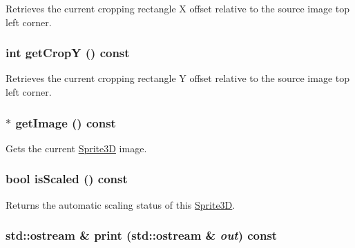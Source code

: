 Retrieves the current cropping rectangle X offset relative to the source image top left corner. \hypertarget{classm3g_1_1Sprite3D_9ef03b219415a1f08aef6745ad5d87d0}{
\subsubsection[{getCropY}]{\setlength{\rightskip}{0pt plus 5cm}int getCropY () const}}
\label{classm3g_1_1Sprite3D_9ef03b219415a1f08aef6745ad5d87d0}


Retrieves the current cropping rectangle Y offset relative to the source image top left corner. \hypertarget{classm3g_1_1Sprite3D_a8c0193b0e7d47d4b5c9f60df24c44f5}{
\subsubsection[{getImage}]{ $\ast$ getImage () const}}
\label{classm3g_1_1Sprite3D_a8c0193b0e7d47d4b5c9f60df24c44f5}


Gets the current \hyperlink{classm3g_1_1Sprite3D}{Sprite3D} image. \hypertarget{classm3g_1_1Sprite3D_8e3e7fa70e1d3f2342580991105779f5}{
\subsubsection[{isScaled}]{\setlength{\rightskip}{0pt plus 5cm}bool isScaled () const}}
\label{classm3g_1_1Sprite3D_8e3e7fa70e1d3f2342580991105779f5}


Returns the automatic scaling status of this \hyperlink{classm3g_1_1Sprite3D}{Sprite3D}. \hypertarget{classm3g_1_1Sprite3D_6fea17fa1532df3794f8cb39cb4f911f}{
\subsubsection[{print}]{\setlength{\rightskip}{0pt plus 5cm}std::ostream \& print (std::ostream \& {\em out}) const}}
\label{classm3g_1_1Sprite3D_6fea17fa1532df3794f8cb39cb4f911f}


